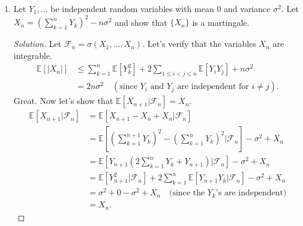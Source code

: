 \documentclass[11pt,letterpaper]{report}
\newcommand{\mcal}[1]{\mathcal{#1}}
\newcommand{\E}{\mathbb{E}}
\newenvironment{solution}
{\begin{proof}[Solution]}
{\end{proof}}
\begin{document}
\begin{enumerate}
\begin{enumerate}
		\item Let $Y_1, \ldots$ be independent random variables with mean 0 and variance $\sigma^2$. Let $X_n = (\sum_{k=1}^nY_k)^2 - n\sigma^2$ and show that $\{X_n\}$ is a martingale.
		\begin{solution}
			Let $\mcal{F}_n = \sigma(X_1, \ldots, X_n)$. Let's verify that the variables $X_n$ are integrable.
			\begin{align*}
				\E[|X_n|] & \leq \sum_{k=1}^n \E[Y_k^2] + 2\sum_{1\leq i<j\leq n}\E[Y_iY_j] + n\sigma^2\\
				&= 2n\sigma^2\quad (\text{since }Y_i \text{ and }Y_j\text{ are independent for }i \neq j).
			\end{align*}
			Great. Now let's show that $\E[X_{n+1}|\mcal{F}_n] = X_n$.
			\begin{align*}
				\E[X_{n+1}|\mcal{F}_n] &= \E[X_{n+1} - X_n + X_n|\mcal{F}_n]\\
				&= \E\left[\left(\sum_{k=1}^{n+1}Y_k\right)^2 - \left(\sum_{k=1}^nY_k\right)^2 \bigg|\mcal{F}_n\right] - \sigma^2 + X_n\\
				&= \E\left[Y_{n+1}\left(2\sum_{k=1}^nY_k + Y_{n+1}\right)\bigg|\mcal{F}_n\right] - \sigma^2 + X_n\\
				&= \E[Y_{n+1}^2|\mcal{F}_n] + 2\sum_{k=1}^n\E[Y_{n+1}Y_k|\mcal{F}_n] - \sigma^2 + X_n\\
				&= \sigma^2 + 0 - \sigma^2 + X_n\quad \text{(since the }Y_k\text{'s are independent)}\\
				&= X_n.
			\end{align*}
		\end{solution}
	\end{enumerate}


\end{enumerate}
\end{document}
